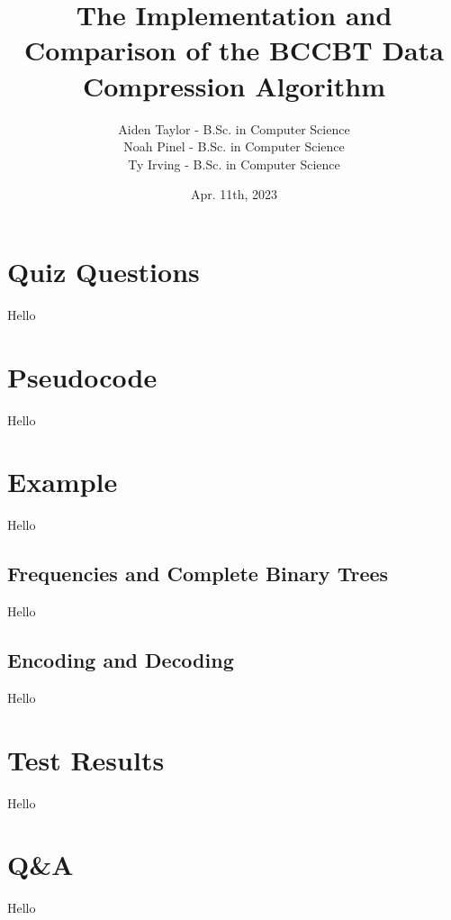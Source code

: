 \documentclass{beamer}
\newcommand{\Aiden}{Aiden Taylor - B.Sc. in Computer Science}
\newcommand{\Noah}{Noah Pinel - B.Sc. in Computer Science}
\newcommand{\Ty}{Ty Irving - B.Sc. in Computer Science}
\begin{document}
\title[CPSC 530]{The Implementation and Comparison of the BCCBT Data Compression Algorithm}
\author[Group 17]{
\begin{tabular}{l}
    \Aiden \\ \Noah\\ \Ty\\ 
\end{tabular}}
\date{Apr. 11th, 2023}

\begingroup
    \frame{\titlepage}
\endgroup

\begin{frame}
    \tableofcontents
\end{frame}

\section{Quiz Questions}
\begin{frame}
Hello
\end{frame}


\section{Pseudocode}
\begin{frame}
Hello
\end{frame}

\section{Example}
\begin{frame}
Hello
\end{frame}

\subsection{Frequencies and Complete Binary Trees}
\begin{frame}
Hello
\end{frame}

\subsection{Encoding and Decoding}
\begin{frame}
Hello
\end{frame}

\section{Test Results}
\begin{frame}
Hello
\end{frame}

\section{Q\&A}
\begin{frame}
Hello
\end{frame}
\end{document}
